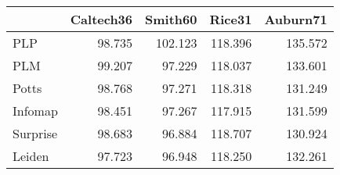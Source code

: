 \begin{tabular}{lrrrr}
\toprule
{} & Caltech36 & Smith60 &  Rice31 & Auburn71 \\
\midrule
PLP      &    98.735 & 102.123 & 118.396 &  135.572 \\
PLM      &    99.207 &  97.229 & 118.037 &  133.601 \\
Potts    &    98.768 &  97.271 & 118.318 &  131.249 \\
Infomap  &    98.451 &  97.267 & 117.915 &  131.599 \\
Surprise &    98.683 &  96.884 & 118.707 &  130.924 \\
Leiden   &    97.723 &  96.948 & 118.250 &  132.261 \\
\bottomrule
\end{tabular}
